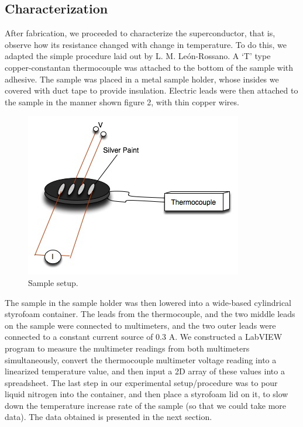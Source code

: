 \documentclass[aps,prl,twocolumn,groupedaddress]{revtex4}
\begin{document}
\subsection{Characterization}
After fabrication, we proceeded to characterize the superconductor, that is, observe how its resistance changed with change in temperature. To do this, we adapted the simple procedure laid out by L. M. Le\'{o}n-Rossano\cite{leon}. A `T' type copper-constantan thermocouple was attached to the bottom of the sample with adhesive. The sample was placed in a metal sample holder, whose insides we covered with duct tape to provide insulation. Electric leads were then attached to the sample in the manner shown figure 2, with thin copper wires.
\begin{figure}[htbp]
\begin{center}
\includegraphics[scale=0.55]{superconductor.jpg}
\caption{Sample setup.}
\label{default}
\end{center}
\end{figure}
The sample in the sample holder was then lowered into a wide-based cylindrical styrofoam container. The leads from the thermocouple, and the two middle leads on the sample were connected to multimeters, and the two outer leads were connected to a constant current source of 0.3 A. We constructed a LabVIEW program to measure the multimeter readings from both multimeters simultaneously, convert the thermocouple multimeter voltage reading into a linearized temperature value, and then input a 2D array of these values into a spreadsheet. The last step in our experimental setup/procedure was to pour liquid nitrogen into the container, and then place a styrofoam lid on it, to slow down the temperature increase rate of the sample (so that we could take more data). The data obtained is presented in the next section.
\end{document}
